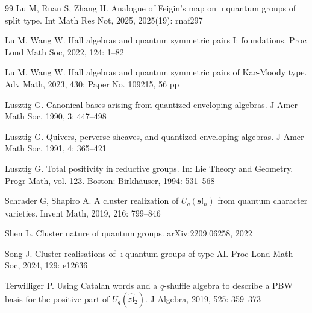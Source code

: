\documentclass[reqno,11pt]{amsart}
\numberwithin{equation}{section}
\begin{document}
\begin{thebibliography}{99}
Lu M, Ruan S, Zhang H. Analogue of Feigin's map on $\imath$quantum groups of split type. Int Math Res Not, 2025, 2025(19): rnaf297

Lu M, Wang W. Hall algebras and quantum symmetric pairs I: foundations. Proc Lond Math Soc, 2022, 124: 1--82

Lu M, Wang W. Hall algebras and quantum symmetric pairs of Kac-Moody type. Adv Math, 2023, 430: Paper No. 109215, 56 pp

Lusztig G. Canonical bases arising from quantized enveloping algebras. J Amer Math Soc, 1990, 3: 447--498

Lusztig G. Quivers, perverse sheaves, and quantized enveloping algebras. J Amer Math Soc, 1991, 4: 365--421

Lusztig G. Total positivity in reductive groups. In: Lie Theory and Geometry. Progr Math, vol. 123. Boston: Birkh\"auser, 1994: 531--568

Schrader G, Shapiro A. A cluster realization of $U_q(\mathfrak{sl}_n)$ from quantum character varieties. Invent Math, 2019, 216: 799--846

Shen L. Cluster nature of quantum groups. arXiv:2209.06258, 2022

Song J. Cluster realisations of $\imath$quantum groups of type AI. Proc Lond Math Soc, 2024, 129: e12636

Terwilliger P. Using Catalan words and a $q$-shuffle algebra to describe a PBW basis for the positive part of $U_q(\widehat{\mathfrak{sl}}_2)$. J Algebra, 2019, 525: 359--373

\end{thebibliography}
\end{document}
